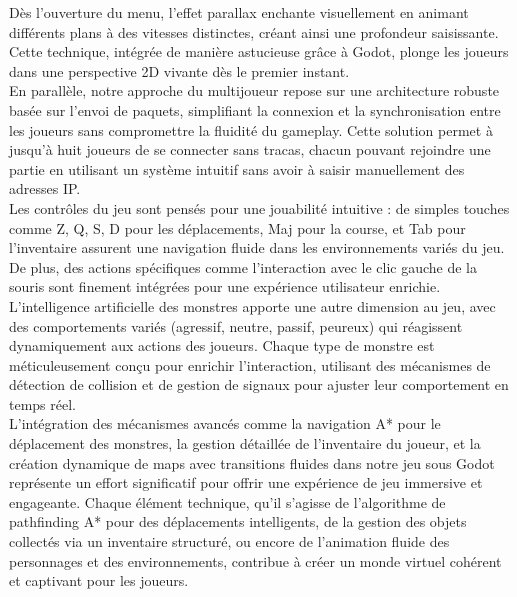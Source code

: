 Dès l'ouverture du menu, l'effet parallax enchante visuellement en animant différents plans à des vitesses distinctes,
 créant ainsi une profondeur saisissante. Cette technique, intégrée de manière astucieuse grâce à Godot, plonge les joueurs dans une perspective 2D 
 vivante dès le premier instant.
\\

En parallèle, notre approche du multijoueur repose sur une architecture robuste basée sur l'envoi de paquets, simplifiant 
la connexion et la synchronisation entre les joueurs sans compromettre la fluidité du gameplay. Cette solution permet à jusqu'à huit joueurs 
de se connecter sans tracas, chacun pouvant rejoindre une partie en utilisant un système intuitif sans avoir à saisir manuellement des adresses IP.
\\

Les contrôles du jeu sont pensés pour une jouabilité intuitive : de simples touches comme Z, Q, S, D pour les déplacements, Maj pour la course,
 et Tab pour l'inventaire assurent une navigation fluide dans les environnements variés du jeu. De plus, des actions spécifiques comme l'interaction 
 avec le clic gauche de la souris sont finement intégrées pour une expérience utilisateur enrichie.
\\

L'intelligence artificielle des monstres apporte une autre dimension au jeu, avec des comportements variés (agressif, neutre, passif, peureux) qui 
réagissent dynamiquement aux actions des joueurs. Chaque type de monstre est méticuleusement conçu pour enrichir l'interaction, utilisant des mécanismes
 de détection de collision et de gestion de signaux pour ajuster leur comportement en temps réel.
\\



 L'intégration des mécanismes avancés comme la navigation A* pour le déplacement des monstres, la gestion détaillée de l'inventaire du joueur, et la 
 création dynamique de maps avec transitions fluides dans notre jeu sous Godot représente un effort significatif pour offrir une expérience de jeu
  immersive et engageante. Chaque élément technique, qu'il s'agisse de l'algorithme de pathfinding A* pour des déplacements intelligents, 
 de la gestion des objets collectés via un inventaire structuré, ou encore de l'animation fluide des 
 personnages et des environnements, contribue à créer un monde virtuel cohérent et captivant pour les joueurs.
\\

